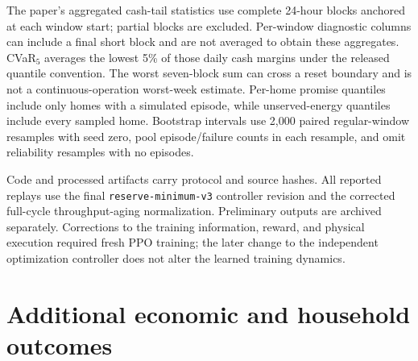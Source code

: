 The paper's aggregated cash-tail statistics use complete 24-hour blocks anchored at each window start; partial blocks are excluded. Per-window diagnostic columns can include a final short block and are not averaged to obtain these aggregates. CVaR$_5$ averages the lowest 5\% of those daily cash margins under the released quantile convention. The worst seven-block sum can cross a reset boundary and is not a continuous-operation worst-week estimate. Per-home promise quantiles include only homes with a simulated episode, while unserved-energy quantiles include every sampled home. Bootstrap intervals use 2,000 paired regular-window resamples with seed zero, pool episode/failure counts in each resample, and omit reliability resamples with no episodes.

Code and processed artifacts carry protocol and source hashes. All reported replays use the final \texttt{reserve-minimum-v3} controller revision and the corrected full-cycle throughput-aging normalization. Preliminary outputs are archived separately. Corrections to the training information, reward, and physical execution required fresh PPO training; the later change to the independent optimization controller does not alter the learned training dynamics.

\begin{table}[htbp]
\centering\small

\caption{All ten promise-cost candidates on Houston 2024. Asterisk denotes the fixed validation selection. Margin difference is \$/home-year against fixed 20\%; throughput is charge plus discharge kWh/home-year. Promise and mean SOC are percentages. Names encode penalty and seed.}
\label{tab:promise-seeds}
\end{table}

\begin{table}[htbp]
\centering\small

\caption{All eleven full-outage-cost and reserve-ablation runs, with the same units as Table~\ref{tab:promise-seeds}. ``None'' removes the operating reserve but retains physical battery limits. These runs do not participate in selecting the headline promise-cost candidate.}
\label{tab:other-seeds}
\end{table}
\FloatBarrier

\clearpage
\section{Additional economic and household outcomes}
\label{app:tails}
\begingroup
\setlength{\intextsep}{8pt}

